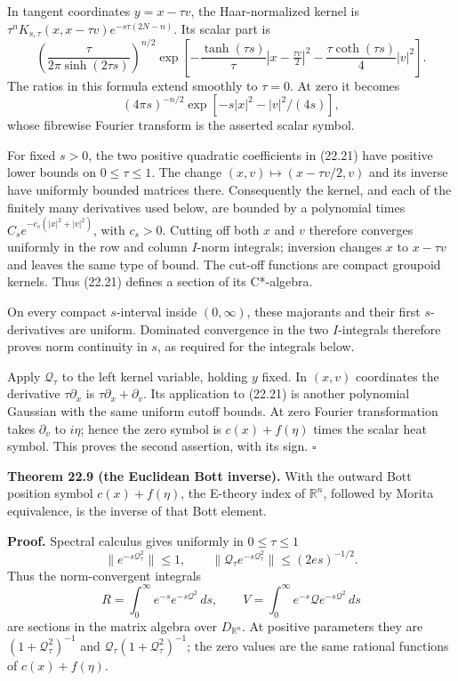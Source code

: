 \documentclass[
  11pt,
]{article}
\begin{document}
In tangent coordinates \(y=x-\tau v\), the Haar-normalized kernel is
\(\tau^nK_{s,\tau}(x,x-\tau v)e^{-s\tau(2N-n)}\). Its scalar part is \[
\left(\frac{\tau}{2\pi\sinh(2\tau s)}\right)^{n/2}
\exp\!\left[-\frac{\tanh(\tau s)}{\tau}
 |x-\tfrac{\tau v}{2}|^2-\frac{\tau\coth(\tau s)}4|v|^2\right].
\tag{22.21}
\] The ratios in this formula extend smoothly to \(\tau=0\). At zero it
becomes \[
(4\pi s)^{-n/2}\exp[-s|x|^2-|v|^2/(4s)],
\tag{22.22}
\] whose fibrewise Fourier transform is the asserted scalar symbol.

For fixed \(s>0\), the two positive quadratic coefficients in (22.21)
have positive lower bounds on \(0\leq\tau\leq1\). The change
\((x,v)\mapsto(x-\tau v/2,v)\) and its inverse have uniformly bounded
matrices there. Consequently the kernel, and each of the finitely many
derivatives used below, are bounded by a polynomial times
\(C_s e^{-c_s(|x|^2+|v|^2)}\), with \(c_s>0\). Cutting off both \(x\)
and \(v\) therefore converges uniformly in the row and column \(I\)-norm
integrals; inversion changes \(x\) to \(x-\tau v\) and leaves the same
type of bound. The cut-off functions are compact groupoid kernels. Thus
(22.21) defines a section of its C*-algebra.

On every compact \(s\)-interval inside \((0,\infty)\), these majorants
and their first \(s\)-derivatives are uniform. Dominated convergence in
the two \(I\)-integrals therefore proves norm continuity in \(s\), as
required for the integrals below.

Apply \(\mathcal Q_\tau\) to the left kernel variable, holding \(y\)
fixed. In \((x,v)\) coordinates the derivative \(\tau\partial_x\) is
\(\tau\partial_x+\partial_v\). Its application to (22.21) is another
polynomial Gaussian with the same uniform cutoff bounds. At zero Fourier
transformation takes \(\partial_v\) to \(i\eta\); hence the zero symbol
is \(c(x)+f(\eta)\) times the scalar heat symbol. This proves the second
assertion, with its sign. \(\square\)

\textbf{Theorem 22.9 (the Euclidean Bott inverse).} With the outward
Bott position symbol \(c(x)+f(\eta)\), the E-theory index of
\(\mathbb R^n\), followed by Morita equivalence, is the inverse of that
Bott element.

\textbf{Proof.} Spectral calculus gives uniformly in \(0\leq\tau\leq1\)
\[
\|e^{-s\mathcal Q_\tau^2}\|\leq1,\qquad
\|\mathcal Q_\tau e^{-s\mathcal Q_\tau^2}\|
\leq(2es)^{-1/2}.
\] Thus the norm-convergent integrals \[
R=\int_0^\infty e^{-s}e^{-s\mathcal Q^2}\,ds,\qquad
V=\int_0^\infty e^{-s}\mathcal Q e^{-s\mathcal Q^2}\,ds
\tag{22.23}
\] are sections in the matrix algebra over \(D_{\mathbb R^n}\). At
positive parameters they are \((1+\mathcal Q_\tau^2)^{-1}\) and
\(\mathcal Q_\tau(1+\mathcal Q_\tau^2)^{-1}\); the zero values are the
same rational functions of \(c(x)+f(\eta)\).
\end{document}
